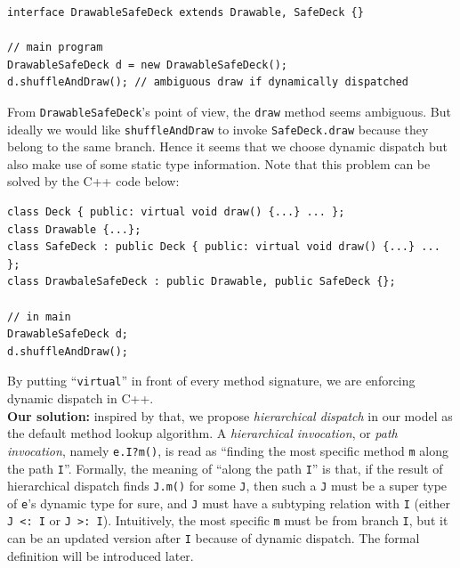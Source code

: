 \vspace{3pt}\begin{lstlisting}
interface DrawableSafeDeck extends Drawable, SafeDeck {}

// main program
DrawableSafeDeck d = new DrawableSafeDeck();
d.shuffleAndDraw(); // ambiguous draw if dynamically dispatched
\end{lstlisting}\vspace{3pt}
From \lstinline|DrawableSafeDeck|'s point of view, the \lstinline|draw| method seems ambiguous. But ideally we would
like \lstinline|shuffleAndDraw| to invoke \lstinline|SafeDeck.draw| because they belong to the same branch. Hence it
seems that we choose dynamic dispatch but also make use of some static type information. Note that this problem can be
solved by the C++ code below:
\vspace{3pt}\begin{lstlisting}
class Deck { public: virtual void draw() {...} ... };
class Drawable {...};
class SafeDeck : public Deck { public: virtual void draw() {...} ... };
class DrawbaleSafeDeck : public Drawable, public SafeDeck {};

// in main
DrawableSafeDeck d;
d.shuffleAndDraw();
\end{lstlisting}\vspace{3pt}
By putting ``\lstinline|virtual|'' in front of every method signature, we are enforcing dynamic dispatch in C++.\\

\noindent\textbf{Our solution:} inspired by that, we propose \textit{hierarchical dispatch} in our model
as the default method lookup algorithm. A \textit{hierarchical invocation}, or \textit{path invocation}, namely
\lstinline|e.I?m()|, is read as
``finding the most specific method \lstinline|m| along the path
\lstinline|I|''. Formally, the meaning of ``along the path \lstinline|I|'' is
that, if the result of hierarchical dispatch finds \lstinline|J.m()| for some \lstinline|J|, then such a \lstinline|J| must be a super type of \lstinline|e|'s dynamic type for sure, and \lstinline|J| must have a subtyping relation with \lstinline|I| (either \lstinline|J <: I| or \lstinline|J >: I|). Intuitively, the most specific \lstinline|m| must be from branch \lstinline|I|, but it can be an updated version after \lstinline|I| because of dynamic dispatch. The formal definition will be introduced later.

